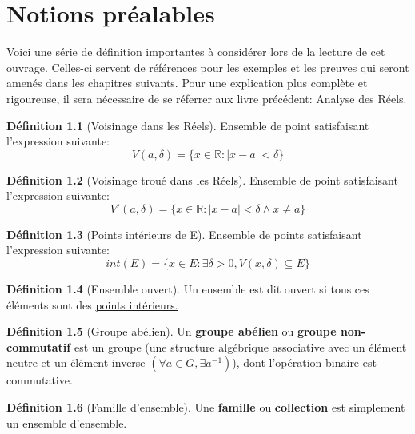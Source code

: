 \documentclass[12pt]{book}
\let\Bbb\mathbb
\newcommand\todo[1]{\phantom{#1}}
\theoremstyle{definition}
\newtheorem{definition}{Définition}[section]
\begin{document}
\chapter{Notions préalables}
Voici une série de définition importantes à considérer lors de la lecture de cet ouvrage. Celles-ci servent
de références pour les exemples et les preuves qui seront amenés dans les chapitres suivants. Pour une explication
plus complète et rigoureuse, il sera nécessaire de se réferrer aux livre précédent: Analyse des Réels.

\begin{definition}[Voisinage dans les Réels]
    \label{def:voisinage_reels}
    Ensemble de point satisfaisant l'expression
    suivante: $$V(a, \delta) = \{ x \in \Bbb R : |x - a| < \delta \}$$
\end{definition}

\begin{definition}[Voisinage troué dans les Réels]
    \label{def:voisinage_troue_reels}
    Ensemble de point satisfaisant l'expression
    suivante: $$V'(a, \delta) = \{ x \in \Bbb R : |x - a| < \delta \land x \neq a \}$$
\end{definition}

\begin{definition}[Points intérieurs de E]
    \label{def:point_int}
    Ensemble de points satisfaisant l'expression
    suivante: $$int(E) = \{ x \in E : \exists \delta > 0, V(x, \delta) \subseteq E \} $$
\end{definition}

\begin{definition}[Ensemble ouvert]
    \label{def:ensemble_ouvert}
    Un ensemble est dit ouvert si tous ces éléments sont des \hyperref[def:point_int]{points intérieurs.}
\end{definition}

\begin{definition}[Groupe abélien]
    \label{def:groupe_abelien}
    Un \textbf{groupe abélien} ou \textbf{groupe non-commutatif} est un groupe
    (une structure algébrique associative avec un élément neutre et un élément inverse $(\forall a \in G, \exists a^{-1})$), 
    dont l'opération binaire est commutative.
\end{definition}

\begin{definition}[Famille d'ensemble]
    \label{def:famille}
    Une \textbf{famille} ou \textbf{collection} est simplement un ensemble d'ensemble.
\end{definition}
\todo{Add reference}
\end{document}
